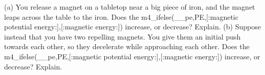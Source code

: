         (a) You release a magnet on a tabletop near a big piece
        of iron, and the magnet leaps across the table to the iron.
        Does the m4_ifelse(__pe,PE,[:magnetic potential energy:],[:magnetic energy:]) increase, or decrease?
        Explain. (b) Suppose instead that you have two repelling
        magnets. You give them an initial push towards each other,
        so they decelerate while approaching each other. Does the
        m4_ifelse(__pe,PE,[:magnetic potential energy:],[:magnetic energy:]) increase, or decrease? Explain.
